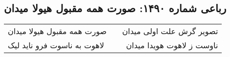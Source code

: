 \begin{center}
\section*{رباعی شماره ۱۴۹۰: صورت همه مقبول هیولا میدان}
\label{sec:1490}
\begin{longtable}{l p{0.5cm} r}
صورت همه مقبول هیولا میدان
&&
تصویر گرش علت اولی میدان
\\
لاهوت به ناسوت فرو ناید لیک
&&
ناوست ز لاهوت هویدا میدان
\\
\end{longtable}
\end{center}
